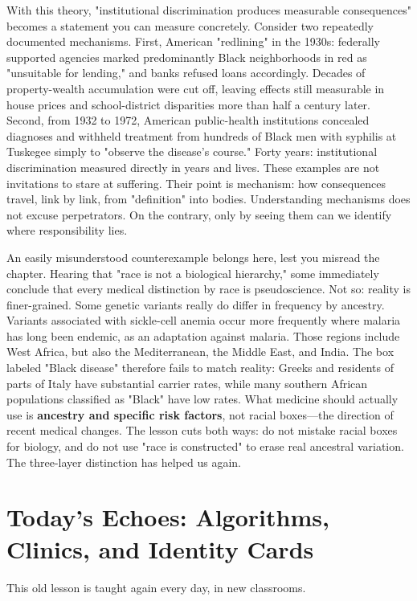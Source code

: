 With this theory, "institutional discrimination produces measurable consequences" becomes a statement you can measure concretely. Consider two repeatedly documented mechanisms. First, American "redlining" in the 1930s: federally supported agencies marked predominantly Black neighborhoods in red as "unsuitable for lending," and banks refused loans accordingly. Decades of property-wealth accumulation were cut off, leaving effects still measurable in house prices and school-district disparities more than half a century later. Second, from 1932 to 1972, American public-health institutions concealed diagnoses and withheld treatment from hundreds of Black men with syphilis at Tuskegee simply to "observe the disease's course." Forty years: institutional discrimination measured directly in years and lives. These examples are not invitations to stare at suffering. Their point is mechanism: how consequences travel, link by link, from "definition" into bodies. Understanding mechanisms does not excuse perpetrators. On the contrary, only by seeing them can we identify where responsibility lies.

An easily misunderstood counterexample belongs here, lest you misread the chapter. Hearing that "race is not a biological hierarchy," some immediately conclude that every medical distinction by race is pseudoscience. Not so: reality is finer-grained. Some genetic variants really do differ in frequency by ancestry. Variants associated with sickle-cell anemia occur more frequently where malaria has long been endemic, as an adaptation against malaria. Those regions include West Africa, but also the Mediterranean, the Middle East, and India. The box labeled "Black disease" therefore fails to match reality: Greeks and residents of parts of Italy have substantial carrier rates, while many southern African populations classified as "Black" have low rates. What medicine should actually use is \textbf{ancestry and specific risk factors}, not racial boxes---the direction of recent medical changes. The lesson cuts both ways: do not mistake racial boxes for biology, and do not use "race is constructed" to erase real ancestral variation. The three-layer distinction has helped us again.

\section[Algorithms, Clinics, and Identity Cards]{Today's Echoes: Algorithms, Clinics, and Identity Cards}
This old lesson is taught again every day, in new classrooms.

